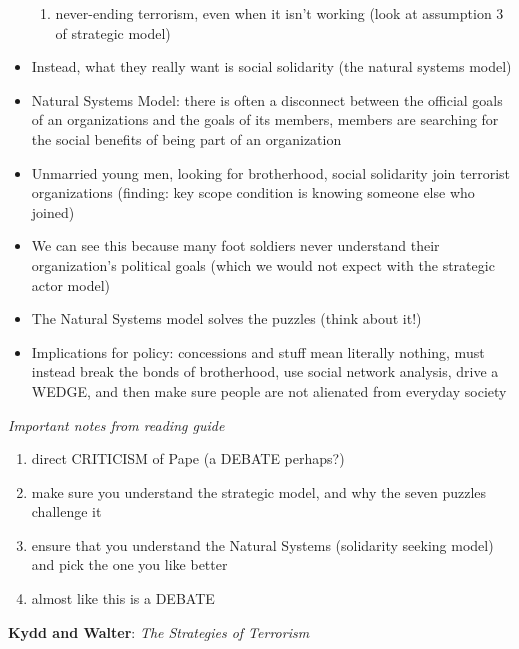 \documentclass{article}
\begin{document}
\begin{itemize}
\begin{enumerate}
        \item never-ending terrorism, even when it isn't working (look at assumption 3 of strategic model)
    \end{enumerate}
    \item Instead, what they really want is social solidarity (the natural systems model)
    \item Natural Systems Model: there is often a disconnect between the official goals of an organizations and the goals of its members, members are searching for the social benefits of being part of an organization
    \item Unmarried young men, looking for brotherhood, social solidarity join terrorist organizations (finding: key scope condition is knowing someone else who joined)
    \item We can see this because many foot soldiers never understand their organization's political goals (which we would not expect with the strategic actor model)
    \item The Natural Systems model solves the puzzles (think about it!)
    \item Implications for policy: concessions and stuff mean literally nothing, must instead break the bonds of brotherhood, use social network analysis, drive a WEDGE, and then make sure people are not alienated from everyday society
\end{itemize}
\textit{Important notes from reading guide}
\begin{enumerate}
    \item direct CRITICISM of Pape (a DEBATE perhaps?)
    \item make sure you understand the strategic model, and why the seven puzzles challenge it
    \item ensure that you understand the Natural Systems (solidarity seeking model) and pick the one you like better
    \item almost like this is a DEBATE
\end{enumerate}
\bigskip
\textbf{Kydd and Walter}: \textit{The Strategies of Terrorism}
\end{document}
